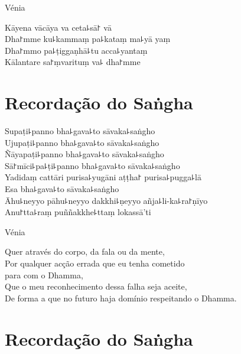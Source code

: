 \clearpage

\begin{instruction}
  Vénia
\end{instruction}

Kāyena vācāya va ceta꜕sā꜓ vā\\
Dha꜓mme ku꜕kammaṃ pa꜕kataṃ ma꜕yā yaṃ\\
Dha꜓mmo pa꜕ṭiggaṇhā꜕tu acca꜕yantaṃ\\
Kālantare sa꜓ṃvarituṃ va꜕ dha꜓mme

\chapter*{Recordação do Saṅgha}

\delegateSetUseNext

\begin{leader}
\end{leader}

Supaṭi꜕panno bha꜕gava꜕to sāvaka꜕saṅgho\\
Ujupaṭi꜕panno bha꜕gava꜕to sāvaka꜕saṅgho\\
Ñāyapaṭi꜕panno bha꜕gava꜕to sāvaka꜕saṅgho\\
Sā꜓mīci꜕pa꜕ṭi꜕panno bha꜕gava꜕to sāvaka꜕saṅgho\\
Yadidaṃ cattāri purisa꜕yugāni aṭṭha꜓ purisa꜕pugga꜕lā\\
Esa bha꜕gava꜕to sāvaka꜕saṅgho\\
Āhu꜕neyyo pāhu꜕neyyo dakkhi꜕ṇeyyo añja꜕li-ka꜕ra꜓ṇīyo\\
Anu꜓tta꜕raṃ puññakkhe꜕ttaṃ lokassā'ti

\clearpage

\begin{instruction}
  Vénia
\end{instruction}

Quer através do corpo, da fala ou da mente,\\
Por qualquer acção errada que eu tenha cometido\\
\vin para com o Dhamma,\\
Que o meu reconhecimento dessa falha seja aceite,\\
De forma a que no futuro haja domínio respeitando o Dhamma.

\chapter{Recordação do Saṅgha}

\begin{leader}
\end{leader}

